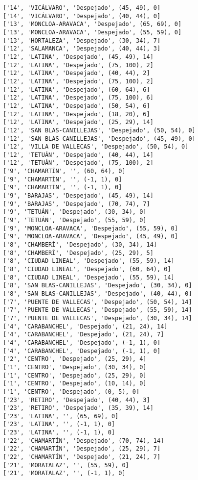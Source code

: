 \documentclass[11pt]{article}
\begin{document}
\begin{Verbatim}[commandchars=\\\{\}]
['14', 'VICÁLVARO', 'Despejado', (45, 49), 0]
['14', 'VICÁLVARO', 'Despejado', (40, 44), 0]
['13', 'MONCLOA-ARAVACA', 'Despejado', (65, 69), 0]
['13', 'MONCLOA-ARAVACA', 'Despejado', (55, 59), 0]
['13', 'HORTALEZA', 'Despejado', (30, 34), 7]
['12', 'SALAMANCA', 'Despejado', (40, 44), 3]
['12', 'LATINA', 'Despejado', (45, 49), 14]
['12', 'LATINA', 'Despejado', (75, 100), 2]
['12', 'LATINA', 'Despejado', (40, 44), 2]
['12', 'LATINA', 'Despejado', (75, 100), 2]
['12', 'LATINA', 'Despejado', (60, 64), 6]
['12', 'LATINA', 'Despejado', (75, 100), 6]
['12', 'LATINA', 'Despejado', (50, 54), 6]
['12', 'LATINA', 'Despejado', (18, 20), 6]
['12', 'LATINA', 'Despejado', (25, 29), 14]
['12', 'SAN BLAS-CANILLEJAS', 'Despejado', (50, 54), 0]
['12', 'SAN BLAS-CANILLEJAS', 'Despejado', (45, 49), 0]
['12', 'VILLA DE VALLECAS', 'Despejado', (50, 54), 0]
['12', 'TETUÁN', 'Despejado', (40, 44), 14]
['12', 'TETUÁN', 'Despejado', (75, 100), 2]
['9', 'CHAMARTÍN', '', (60, 64), 0]
['9', 'CHAMARTÍN', '', (-1, 1), 0]
['9', 'CHAMARTÍN', '', (-1, 1), 0]
['9', 'BARAJAS', 'Despejado', (45, 49), 14]
['9', 'BARAJAS', 'Despejado', (70, 74), 7]
['9', 'TETUÁN', 'Despejado', (30, 34), 0]
['9', 'TETUÁN', 'Despejado', (55, 59), 0]
['9', 'MONCLOA-ARAVACA', 'Despejado', (55, 59), 0]
['9', 'MONCLOA-ARAVACA', 'Despejado', (45, 49), 0]
['8', 'CHAMBERÍ', 'Despejado', (30, 34), 14]
['8', 'CHAMBERÍ', 'Despejado', (25, 29), 5]
['8', 'CIUDAD LINEAL', 'Despejado', (55, 59), 14]
['8', 'CIUDAD LINEAL', 'Despejado', (60, 64), 0]
['8', 'CIUDAD LINEAL', 'Despejado', (55, 59), 14]
['8', 'SAN BLAS-CANILLEJAS', 'Despejado', (30, 34), 0]
['8', 'SAN BLAS-CANILLEJAS', 'Despejado', (40, 44), 0]
['7', 'PUENTE DE VALLECAS', 'Despejado', (50, 54), 14]
['7', 'PUENTE DE VALLECAS', 'Despejado', (55, 59), 14]
['7', 'PUENTE DE VALLECAS', 'Despejado', (30, 34), 14]
['4', 'CARABANCHEL', 'Despejado', (21, 24), 14]
['4', 'CARABANCHEL', 'Despejado', (21, 24), 7]
['4', 'CARABANCHEL', 'Despejado', (-1, 1), 0]
['4', 'CARABANCHEL', 'Despejado', (-1, 1), 0]
['2', 'CENTRO', 'Despejado', (25, 29), 4]
['1', 'CENTRO', 'Despejado', (30, 34), 0]
['1', 'CENTRO', 'Despejado', (25, 29), 0]
['1', 'CENTRO', 'Despejado', (10, 14), 0]
['1', 'CENTRO', 'Despejado', (0, 5), 0]
['23', 'RETIRO', 'Despejado', (40, 44), 3]
['23', 'RETIRO', 'Despejado', (35, 39), 14]
['23', 'LATINA', '', (65, 69), 0]
['23', 'LATINA', '', (-1, 1), 0]
['23', 'LATINA', '', (-1, 1), 0]
['22', 'CHAMARTÍN', 'Despejado', (70, 74), 14]
['22', 'CHAMARTÍN', 'Despejado', (25, 29), 7]
['22', 'CHAMARTÍN', 'Despejado', (21, 24), 7]
['21', 'MORATALAZ', '', (55, 59), 0]
['21', 'MORATALAZ', '', (-1, 1), 0]

\end{Verbatim}
\end{document}
